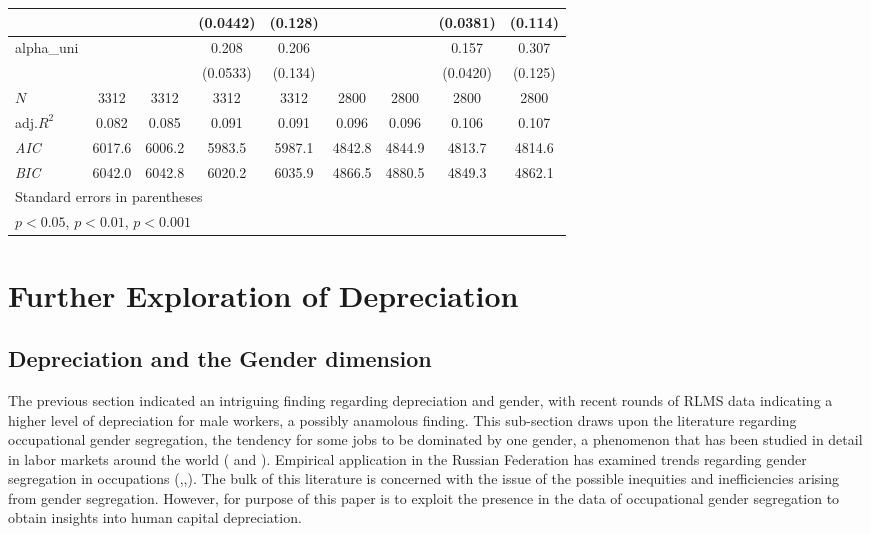 \documentclass[alpha-refs]{wiley-article-02b}
\begin{document}
\begin{table}[htbp!]
\begin{tabular}{l*{8}{c}}
		&&&(0.0442)&(0.128)&&&(0.0381)&(0.114)\\
		\hline
		alpha\_uni&&&0.208\sym{***}&0.206&&&0.157\sym{***}&0.307\sym{*}\\
		&&&(0.0533)&(0.134)&&&(0.0420)&(0.125)\\
		\hline
		\(N\)&3312&3312&3312&3312&2800&2800&2800&2800\\
		adj.\(R^{2}\)&0.082&0.085&0.091&0.091&0.096&0.096&0.106&0.107\\
		\textit{AIC}&6017.6&6006.2&5983.5&5987.1&4842.8&4844.9&4813.7&4814.6\\
		\textit{BIC}&6042.0&6042.8&6020.2&6035.9&4866.5&4880.5&4849.3&4862.1\\
		\bottomrule
		\multicolumn{9}{l}{\footnotesize Standard errors in parentheses}\\
		\multicolumn{9}{l}{\footnotesize \sym{*} \(p<0.05\), \sym{**} \(p<0.01\), \sym{***} \(p<0.001\)}\\
	\end{tabular}
\end{table}


\section{Further Exploration of Depreciation}
\subsection{Depreciation and the Gender dimension}

The previous section indicated an intriguing finding regarding depreciation and gender, with recent rounds of RLMS data indicating a higher level of depreciation for male workers, a possibly anamolous finding. This sub-section draws upon the literature regarding occupational gender segregation, the tendency for some jobs to be dominated by one gender, a phenomenon that has been studied in detail in labor markets around the world (\citet{preston_179_1999} and \citet{blau_178_2013}). Empirical application in the Russian Federation has examined trends regarding gender segregation in occupations (\citet{klimova_159._2009},\citet{klimova_131._2012},\citet{kosyakova_121._2015}). The bulk of this literature is concerned with the issue of the possible inequities and inefficiencies arising from gender segregation. However, for purpose of this paper is to exploit the presence in the data of occupational gender segregation to obtain insights into human capital depreciation.
\end{document}
